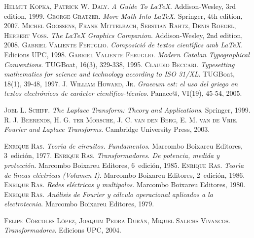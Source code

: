 \begin{thebibliography}{99}


     \textsc{Helmut Kopka, Patrick W. Daly}. \textsl{A Guide To \LaTeX}.  Addison-Wesley, 3rd edition, 1999.
     \textsc{George Gr\"{a}tzer}. \textsl{More Math Into \LaTeX}.  Springer, 4th edition, 2007.
     \textsc{Michel Goossens, Frank Mittelbach, Sebstian Rahtz, Denis Roegel, Herbert Vo{\ss}}. \textsl{The \LaTeX{} Graphics Companion}.  Addison-Wesley, 2nd edition, 2008.
     \textsc{Gabriel Valiente Feruglio}. \textsl{Composici\'{o} de textos cient\'{\i}fics amb \LaTeX}.  Edicions UPC, 1998.
     \textsc{Gabriel Valiente Feruglio}. \textsl{Modern Catalan Typographical Conventions}.  TUGBoat, 16(3), 329-338, 1995.
     \textsc{Claudio Beccari}. \textsl{Typesetting mathematics for science and technology according to ISO 31/XL}.  TUGBoat, 18(1), 39-48, 1997.
     \textsc{J. William Howard, Jr}. \textsl{Graecum est: el uso del griego en textos electr\'{o}nicos de car\'{a}cter cient\'{\i}fico-t\'{e}cnico}.  Panace@, VI(19), 45-54, 2005.


     \textsc{Joel L. Schiff}. \textsl{The Laplace Transform: Theory and Applications}.  Springer, 1999.
     \textsc{R. J. Beerends, H. G. ter Morsche, J. C. van den Berg, E. M. van de Vrie}. \textsl{Fourier and Laplace Transforms}.  Cambridge University Press, 2003.


     \textsc{Enrique Ras}. \textsl{Teor\'{\i}a de circuitos. Fundamentos}.  Marcombo Boixareu Editores, 3\textordfeminine\ edici\'{o}n, 1977.
     \textsc{Enrique Ras}. \textsl{Transformadores. De potencia, medida y protecci\'{o}n}.  Marcombo Boixareu Editores, 6\textordfeminine\ edici\'{o}n, 1985.
     \textsc{Enrique Ras}. \textsl{Teor\'{\i}a de l\'{\i}neas el\'{e}ctricas (Volumen I)}.  Marcombo Boixareu Editores, 2\textordfeminine\ edici\'{o}n, 1986.
     \textsc{Enrique Ras}. \textsl{Redes el\'{e}ctricas y multipolos}.  Marcombo Boixareu Editores, 1980.
     \textsc{Enrique Ras}. \textsl{An\'{a}lisis de Fourier y c\'{a}lculo operacional aplicados a la electrotecnia}.  Marcombo Boixareu Editores, 1979.

     \textsc{Felipe C\'{o}rcoles L\'{o}pez, Joaquim Pedra Dur\'{a}n, Miquel Salichs Vivancos}. \textsl{Transformadores}.  Edicions UPC, 2004.



\end{thebibliography}
